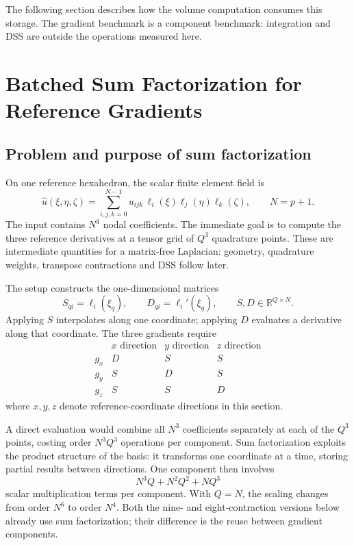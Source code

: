 \documentclass[11pt]{article}
\begin{document}
The following section describes how the volume computation consumes this
storage. The gradient benchmark is a component benchmark: integration and DSS
are outside the operations measured here.

\section{Batched Sum Factorization for Reference Gradients}
\label{sec:sum-factorization}

\subsection{Problem and purpose of sum factorization}

On one reference hexahedron, the scalar finite element field is
\[
 \widehat u(\xi,\eta,\zeta)
 = \sum_{i,j,k=0}^{N-1}
   u_{ijk}\,\ell_i(\xi)\ell_j(\eta)\ell_k(\zeta),
 \qquad N=p+1.
\]
The input contains \(N^3\) nodal coefficients. The immediate goal is to compute
the three reference derivatives at a tensor grid of \(Q^3\) quadrature points.
These are intermediate quantities for a matrix-free Laplacian: geometry,
quadrature weights, transpose contractions and DSS follow later.

The setup constructs the one-dimensional matrices
\[
 S_{qi}=\ell_i(\xi_q), \qquad D_{qi}=\ell_i'(\xi_q),
 \qquad S,D\in\mathbb R^{Q\times N}.
\]
Applying \(S\) interpolates along one coordinate; applying \(D\) evaluates a
derivative along that coordinate. The three gradients require
\[
\begin{array}{c|ccc}
 & x\text{ direction} & y\text{ direction} & z\text{ direction}\\
\hline
 g_x & D & S & S\\
 g_y & S & D & S\\
 g_z & S & S & D
\end{array}
\]
where \(x,y,z\) denote reference-coordinate directions in this section.

A direct evaluation would combine all \(N^3\) coefficients separately at each
of the \(Q^3\) points, costing order \(N^3Q^3\) operations per component.
Sum factorization exploits the product structure of the basis: it transforms
one coordinate at a time, storing partial results between directions. One
component then involves
\[
 N^3Q + N^2Q^2 + NQ^3
\]
scalar multiplication terms per component. With
\(Q=N\), the scaling changes from order \(N^6\) to order \(N^4\).
Both the nine- and eight-contraction versions below already use sum
factorization; their difference is the reuse between gradient components.
\end{document}
